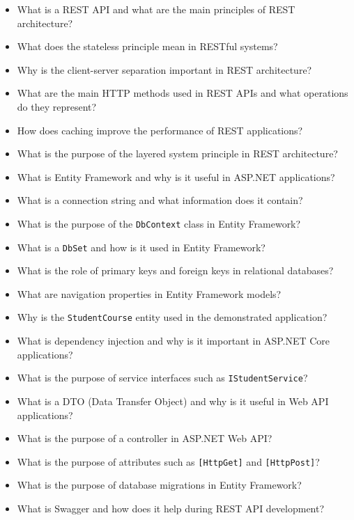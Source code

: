 \begin{itemize}
    \item What is a REST API and what are the main principles of REST architecture?
    
    \item What does the stateless principle mean in RESTful systems?
    
    \item Why is the client-server separation important in REST architecture?
    
    \item What are the main HTTP methods used in REST APIs and what operations do they represent?
    
    \item How does caching improve the performance of REST applications?
    
    \item What is the purpose of the layered system principle in REST architecture?
    
    \item What is Entity Framework and why is it useful in ASP.NET applications?
    
    \item What is a connection string and what information does it contain?
    
    \item What is the purpose of the \texttt{DbContext} class in Entity Framework?
    
    \item What is a \texttt{DbSet} and how is it used in Entity Framework?
    
    \item What is the role of primary keys and foreign keys in relational databases?
    
    \item What are navigation properties in Entity Framework models?
    
    \item Why is the \texttt{StudentCourse} entity used in the demonstrated application?
    
    \item What is dependency injection and why is it important in ASP.NET Core applications?
    
    \item What is the purpose of service interfaces such as \texttt{IStudentService}?
    
    \item What is a DTO (Data Transfer Object) and why is it useful in Web API applications?
    
    \item What is the purpose of a controller in ASP.NET Web API?
    
    \item What is the purpose of attributes such as \texttt{[HttpGet]} and \texttt{[HttpPost]}?
    
    \item What is the purpose of database migrations in Entity Framework?
    
    \item What is Swagger and how does it help during REST API development?
\end{itemize}
